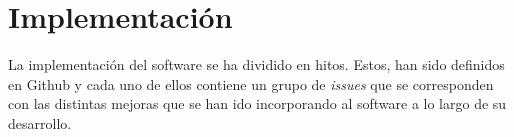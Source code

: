 \chapter{Implementación}

La implementación del software se ha dividido en hitos. Estos, han sido
definidos en Github y cada uno de ellos contiene un grupo de \textit{issues} que
se corresponden con las distintas mejoras que se han ido incorporando al
software a lo largo de su desarrollo.\\

